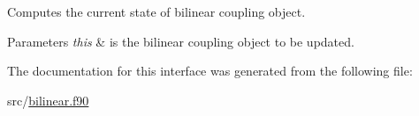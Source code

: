 Computes the current state of bilinear coupling object. 


\begin{DoxyParams}{Parameters}
{\em this} & is the bilinear coupling object to be updated. \\
\hline
\end{DoxyParams}


The documentation for this interface was generated from the following file\-:\begin{DoxyCompactItemize}
\item 
src/\hyperlink{bilinear_8f90}{bilinear.\-f90}\end{DoxyCompactItemize}
